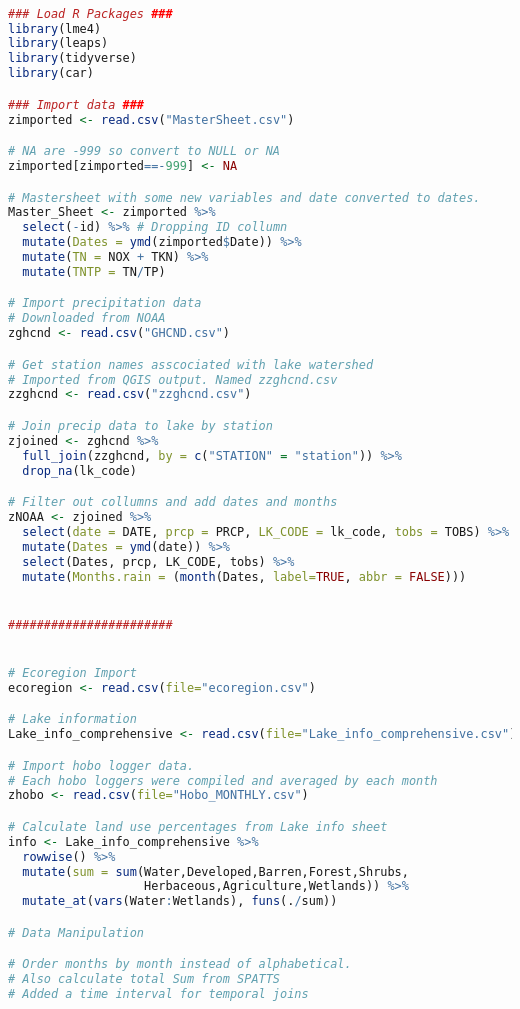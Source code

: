\begin{lstlisting}[language=R, basicstyle=\small\ttfamily]

### Load R Packages ###
library(lme4)
library(leaps)
library(tidyverse)
library(car)

### Import data ###
zimported <- read.csv("MasterSheet.csv")

# NA are -999 so convert to NULL or NA
zimported[zimported==-999] <- NA

# Mastersheet with some new variables and date converted to dates.
Master_Sheet <- zimported %>%
  select(-id) %>% # Dropping ID collumn
  mutate(Dates = ymd(zimported$Date)) %>%
  mutate(TN = NOX + TKN) %>%
  mutate(TNTP = TN/TP)

# Import precipitation data
# Downloaded from NOAA
zghcnd <- read.csv("GHCND.csv")

# Get station names asscociated with lake watershed
# Imported from QGIS output. Named zzghcnd.csv
zzghcnd <- read.csv("zzghcnd.csv")

# Join precip data to lake by station
zjoined <- zghcnd %>%
  full_join(zzghcnd, by = c("STATION" = "station")) %>%
  drop_na(lk_code)

# Filter out collumns and add dates and months
zNOAA <- zjoined %>%
  select(date = DATE, prcp = PRCP, LK_CODE = lk_code, tobs = TOBS) %>%
  mutate(Dates = ymd(date)) %>%
  select(Dates, prcp, LK_CODE, tobs) %>%
  mutate(Months.rain = (month(Dates, label=TRUE, abbr = FALSE)))


#######################


# Ecoregion Import
ecoregion <- read.csv(file="ecoregion.csv")

# Lake information
Lake_info_comprehensive <- read.csv(file="Lake_info_comprehensive.csv")

# Import hobo logger data.
# Each hobo loggers were compiled and averaged by each month
zhobo <- read.csv(file="Hobo_MONTHLY.csv")

# Calculate land use percentages from Lake info sheet
info <- Lake_info_comprehensive %>%
  rowwise() %>%
  mutate(sum = sum(Water,Developed,Barren,Forest,Shrubs,
                   Herbaceous,Agriculture,Wetlands)) %>%
  mutate_at(vars(Water:Wetlands), funs(./sum))

# Data Manipulation

# Order months by month instead of alphabetical.
# Also calculate total Sum from SPATTS
# Added a time interval for temporal joins


\end{lstlisting}
